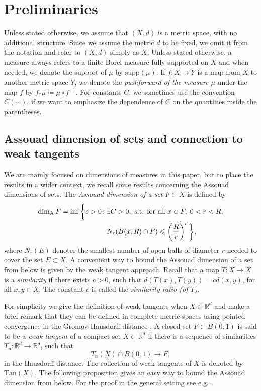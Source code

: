 \documentclass{PRM}
\newcommand{\field}[1]{\mathbb{#1}}
\newcommand{\R}{\field{R}}
\newcommand{\adim}{\dim_{\mathrm{A}}}
\theoremstyle{plain}
\theoremstyle{definition}
\theoremstyle{remark}
\begin{document}
\section{Preliminaries}\label{sec:prelim}
Unless stated otherwise, we assume that $(X,d)$ is a metric space, with no additional structure. Since we assume the metric $d$ to be fixed, we omit it from the notation and refer to $(X,d)$ simply as $X$. Unless stated otherwise, a measure always refers to a finite Borel measure fully supported on $X$ and when needed, we denote the support of $\mu$ by $\mathrm{supp}(\mu)$. If $f:X\to Y$ is a map from $X$ to another metric space $Y$, we denote the \emph{pushforward of the measure $\mu$} under the map $f$ by $f_*\mu\coloneqq\mu\circ f^{-1}$.  For constants $C$, we sometimes use the convention $C(\cdots)$, if we want to emphasize the dependence of $C$ on the quantities inside the parentheses.

\subsection{Assouad dimension of sets and connection to weak tangents}
We are mainly focused on dimensions of measures in this paper, but to place the results in a wider context, we recall some results concerning the Assouad dimensions of sets. The \emph{Assouad dimension of a set} $F\subset X$ is defined by
\begin{align*}
    \adim F=\inf\bigg\{ s>0\colon& \exists C>0,\textnormal{ s.t. for all }x\in F,\; 0<r<R,\\
    &N_r(B(x,R)\cap F)\leq \left(\frac{R}{r}\right)^s\bigg\},
\end{align*}
where $N_r(E)$ denotes the smallest number of open balls of diameter $r$ needed to cover the set $E\subset X$.  A convenient way to bound the Assouad dimension of a set from below is given by the weak tangent approach. Recall that a map $T\colon X\to X$ is a \emph{similarity} if there exists $c>0$, such that $d(T(x),T(y))=c d(x,y)$, for all $x,y\in X$. The constant $c$ is called the \emph{similarity ratio (of $T$)}. 

For simplicity we give the definition of weak tangents when $X\subset \R^d$ and make a brief remark that they can be defined in complete metric spaces using pointed convergence in the Gromov-Hausdorff distance \cite{KL,MT}.  A closed set $F\subset B(0,1)$ is said to be a \emph{weak tangent} of a compact set $X\subset \R^d$ if there is a sequence of similarities $T_n\colon \R^d\to\R^d$, such that
\begin{equation*}
    T_n(X)\cap B(0,1)\to F,
\end{equation*}
in the Hausdorff distance. The collection of weak tangents of $X$ is denoted by $\mathrm{Tan}(X)$. The following proposition gives an easy way to bound the Assouad dimension from below. For the proof in the general setting see e.g. \cite[Proposition 6.1.5]{MT}.
\end{document}
